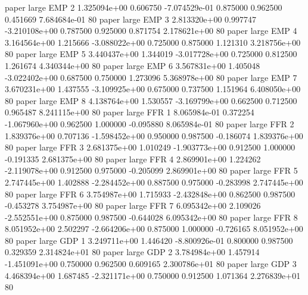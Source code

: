               paper      large      EMP                 2 1.325094e+00      0.606750 -7.074529e-01 0.875000 0.962500       0.451669 7.684684e-01 80
              paper      large      EMP                 3 2.813320e+00      0.997747 -3.210108e+00 0.787500 0.925000       0.871754 2.178621e+00 80
              paper      large      EMP                 4 3.164564e+00      1.215666 -3.088022e+00 0.725000 0.875000       1.121310 3.218756e+00 80
              paper      large      EMP                 5 3.440437e+00      1.344019 -3.017728e+00 0.725000 0.812500       1.261674 4.340344e+00 80
              paper      large      EMP                 6 3.567831e+00      1.405048 -3.022402e+00 0.687500 0.750000       1.273096 5.368978e+00 80
              paper      large      EMP                 7 3.670231e+00      1.437555 -3.109925e+00 0.675000 0.737500       1.151964 6.408050e+00 80
              paper      large      EMP                 8 4.138764e+00      1.530557 -3.169799e+00 0.662500 0.712500       0.965487 8.241115e+00 80
              paper      large      FFR                 1 8.065984e-01      0.372254 -1.067960e+00 0.962500 1.000000      -0.095880 8.065984e-01 80
              paper      large      FFR                 2 1.839376e+00      0.707136 -1.598452e+00 0.950000 0.987500      -0.186074 1.839376e+00 80
              paper      large      FFR                 3 2.681375e+00      1.010249 -1.903773e+00 0.912500 1.000000      -0.191335 2.681375e+00 80
              paper      large      FFR                 4 2.869901e+00      1.224262 -2.119078e+00 0.912500 0.975000      -0.205099 2.869901e+00 80
              paper      large      FFR                 5 2.747445e+00      1.402888 -2.284452e+00 0.887500 0.975000      -0.283998 2.747445e+00 80
              paper      large      FFR                 6 3.754987e+00      1.715933 -2.432848e+00 0.862500 0.987500      -0.453278 3.754987e+00 80
              paper      large      FFR                 7 6.095342e+00      2.109026 -2.552551e+00 0.875000 0.987500      -0.644028 6.095342e+00 80
              paper      large      FFR                 8 8.051952e+00      2.502297 -2.664206e+00 0.875000 1.000000      -0.726165 8.051952e+00 80
              paper      large      GDP                 1 3.249711e+00      1.446420 -8.800926e-01 0.800000 0.987500       0.329359 2.314824e+01 80
              paper      large      GDP                 2 3.784984e+00      1.457914 -1.451091e+00 0.750000 0.962500       0.609165 2.300786e+01 80
              paper      large      GDP                 3 4.468394e+00      1.687485 -2.321171e+00 0.750000 0.912500       1.071364 2.276839e+01 80
